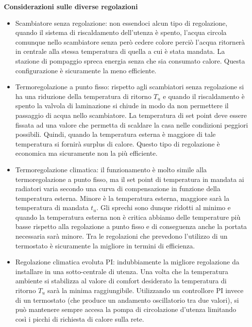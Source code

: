 \documentclass[laurea,oneside,11pt]{USiena_tesiLM}
\begin{document}
\textbf{Considerazioni sulle diverse regolazioni}
\begin{itemize}
\item Scambiatore senza regolazione: non essendoci alcun tipo di regolazione, quando il sistema di riscaldamento dell'utenza è spento, l'acqua circola comunque nello scambiatore senza però cedere colore perciò l'acqua ritornerà in centrale alla stessa temperatura di quella a cui è stata mandata. La stazione di pompaggio spreca energia senza che sia consumato calore. Questa configurazione è sicuramente la meno efficiente.
\item Termoregolazione a punto fisso: rispetto agli scambiatori senza regolazione si ha una riduzione della temperatura di ritorno $T_u$ e quando il riscaldamento è spento la valvola di laminazione si chiude in modo da non permettere il passaggio di acqua nello scambiatore. La temperatura di set point deve essere fissata ad una valore che permetta di scaldare la casa nelle condizioni peggiori possibili. Quindi, quando la temperatura esterna è maggiore di tale temperatura si fornirà surplus di  calore. Questo tipo di regolazione è economica ma sicuramente non la più efficiente.
\item Termoregolazione climatica: il funzionamento è molto simile alla termoregolazione a punto fisso, ma il set point di temperatura in mandata ai radiatori varia secondo una curva di compensazione in funzione della temperatura esterna. Minore è la temperatura esterna, maggiore sarà la temperatura di mandata $t_u$. Gli sprechi sono dunque ridotti al minimo e quando la temperatura esterna non è critica abbiamo delle temperature più basse rispetto alla regolazione a punto fisso e di conseguenza anche la portata necessaria sarà minore. Tra le regolazioni che prevedono l'utilizzo di un termostato è sicuramente la migliore in termini di efficienza.
\item Regolazione climatica evoluta PI: indubbiamente la migliore regolazione da installare in una sotto-centrale di utenza. Una volta che la temperatura ambiente si stabilizza al valore di comfort desiderato la  temperatura di ritorno $T_u$ sarà la minima raggiungibile. Utilizzando un controllore PI invece di un termostato (che produce un andamento oscillatorio tra due valori), si può mantenere sempre accesa la pompa di circolazione d'utenza limitando così i picchi di richiesta di calore sulla rete.


\end{itemize}
\end{document}
